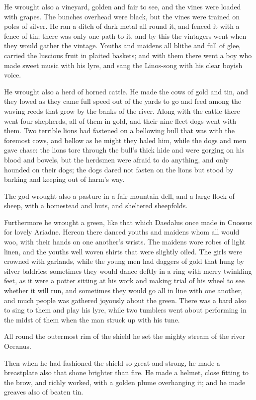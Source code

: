 He wrought also a vineyard, golden and fair to see, and the vines were
loaded with grapes. The bunches overhead were black, but the vines were
trained on poles of silver. He ran a ditch of dark metal all round it, and
fenced it with a fence of tin; there was only one path to it, and by this
the vintagers went when they would gather the vintage. Youths and maidens
all blithe and full of glee, carried the luscious fruit in plaited
baskets; and with them there went a boy who made sweet music with his
lyre, and sang the Linos-song with his clear boyish voice.

He wrought also a herd of horned cattle. He made the cows of gold and tin,
and they lowed as they came full speed out of the yards to go and feed
among the waving reeds that grow by the banks of the river. Along with the
cattle there went four shepherds, all of them in gold, and their nine
fleet dogs went with them. Two terrible lions had fastened on a bellowing
bull that was with the foremost cows, and bellow as he might they haled
him, while the dogs and men gave chase: the lions tore through the bull’s
thick hide and were gorging on his blood and bowels, but the herdsmen were
afraid to do anything, and only hounded on their dogs; the dogs dared not
fasten on the lions but stood by barking and keeping out of harm’s way.

The god wrought also a pasture in a fair mountain dell, and a large flock
of sheep, with a homestead and huts, and sheltered sheepfolds.

Furthermore he wrought a green, like that which Daedalus once made in
Cnossus for lovely Ariadne. Hereon there danced youths and maidens whom
all would woo, with their hands on one another’s wrists. The maidens wore
robes of light linen, and the youths well woven shirts that were slightly
oiled. The girls were crowned with garlands, while the young men had
daggers of gold that hung by silver baldrics; sometimes they would dance
deftly in a ring with merry twinkling feet, as it were a potter sitting at
his work and making trial of his wheel to see whether it will run, and
sometimes they would go all in line with one another, and much people was
gathered joyously about the green. There was a bard also to sing to them
and play his lyre, while two tumblers went about performing in the midst
of them when the man struck up with his tune.

All round the outermost rim of the shield he set the mighty stream of the
river Oceanus.

Then when he had fashioned the shield so great and strong, he made a
breastplate also that shone brighter than fire. He made a helmet, close
fitting to the brow, and richly worked, with a golden plume overhanging
it; and he made greaves also of beaten tin.

